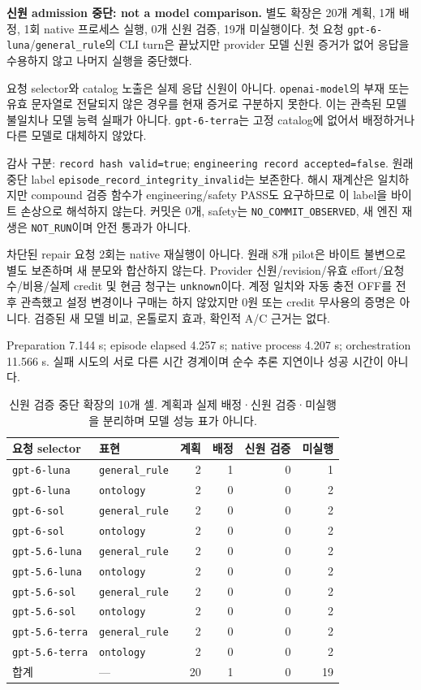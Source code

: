 \textbf{신원 admission 중단: not a model comparison.} 별도 확장은 20개 계획, 1개 배정, 1회 native 프로세스 실행, 0개 신원 검증, 19개 미실행이다. 첫 요청 \texttt{gpt-6-luna}/\texttt{general\_rule}의 CLI turn은 끝났지만 provider 모델 신원 증거가 없어 응답을 수용하지 않고 나머지 실행을 중단했다.

요청 selector와 catalog 노출은 실제 응답 신원이 아니다. \texttt{openai-model}의 부재 또는 유효 문자열로 전달되지 않은 경우를 현재 증거로 구분하지 못한다. 이는 관측된 모델 불일치나 모델 능력 실패가 아니다. \texttt{gpt-6-terra}는 고정 catalog에 없어서 배정하거나 다른 모델로 대체하지 않았다.

감사 구분: \texttt{record hash valid=true}; \texttt{engineering record accepted=false}. 원래 중단 label \texttt{episode\_record\_integrity\_invalid}는 보존한다. 해시 재계산은 일치하지만 compound 검증 함수가 engineering/safety PASS도 요구하므로 이 label을 바이트 손상으로 해석하지 않는다. 커밋은 0개, safety는 \texttt{NO\_COMMIT\_OBSERVED}, 새 엔진 재생은 \texttt{NOT\_RUN}이며 안전 통과가 아니다.

차단된 repair 요청 2회는 native 재실행이 아니다. 원래 8개 pilot은 바이트 불변으로 별도 보존하며 새 분모와 합산하지 않는다. Provider 신원/revision/유효 effort/요청 수/비용/실제 credit 및 현금 청구는 \texttt{unknown}이다. 계정 일치와 자동 충전 OFF를 전후 관측했고 설정 변경이나 구매는 하지 않았지만 0원 또는 credit 무사용의 증명은 아니다. 검증된 새 모델 비교, 온톨로지 효과, 확인적 A/C 근거는 없다.

Preparation 7.144 s; episode elapsed 4.257 s; native process 4.207 s; orchestration 11.566 s. 실패 시도의 서로 다른 시간 경계이며 순수 추론 지연이나 성공 시간이 아니다.
\begin{table}[!ht]
\centering
\setlength{\tabcolsep}{4pt}
\renewcommand{\arraystretch}{1.20}
\caption{신원 검증 중단 확장의 10개 셀. 계획과 실제 배정·신원 검증·미실행을 분리하며 모델 성능 표가 아니다.}
\label{tab:runtime-identity-admission}
\begin{tabular}{llrrrr}
\toprule
요청 selector & 표현 & 계획 & 배정 & 신원 검증 & 미실행 \\
\midrule
\texttt{gpt-6-luna} & \texttt{general\_rule} & 2 & 1 & 0 & 1 \\
\texttt{gpt-6-luna} & \texttt{ontology} & 2 & 0 & 0 & 2 \\
\texttt{gpt-6-sol} & \texttt{general\_rule} & 2 & 0 & 0 & 2 \\
\texttt{gpt-6-sol} & \texttt{ontology} & 2 & 0 & 0 & 2 \\
\texttt{gpt-5.6-luna} & \texttt{general\_rule} & 2 & 0 & 0 & 2 \\
\texttt{gpt-5.6-luna} & \texttt{ontology} & 2 & 0 & 0 & 2 \\
\texttt{gpt-5.6-sol} & \texttt{general\_rule} & 2 & 0 & 0 & 2 \\
\texttt{gpt-5.6-sol} & \texttt{ontology} & 2 & 0 & 0 & 2 \\
\texttt{gpt-5.6-terra} & \texttt{general\_rule} & 2 & 0 & 0 & 2 \\
\texttt{gpt-5.6-terra} & \texttt{ontology} & 2 & 0 & 0 & 2 \\
\midrule
합계 & --- & 20 & 1 & 0 & 19 \\
\bottomrule
\end{tabular}
\end{table}
